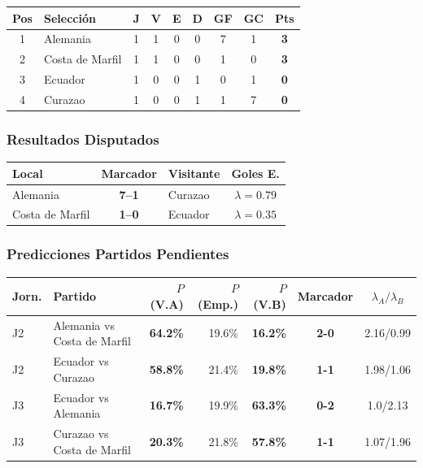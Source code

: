 \documentclass[11pt,a4paper]{article}
\newcommand{\prob}[1]{\textbf{#1\%}}
\begin{document}
\begin{center}
\begin{tabular}{@{}clccccccc@{}}
\toprule
\textbf{Pos} & \textbf{Selección} & \textbf{J} & \textbf{V} & \textbf{E} & \textbf{D} & \textbf{GF} & \textbf{GC} & \textbf{Pts} \\
\midrule
  \cellcolor{green!25}1 & \cellcolor{green!25}Alemania & 1 & 1 & 0 & 0 & 7 & 1 & \textbf{3} \\
  \cellcolor{green!25}2 & \cellcolor{green!25}Costa de Marfil & 1 & 1 & 0 & 0 & 1 & 0 & \textbf{3} \\
  \cellcolor{yellow!20}3 & \cellcolor{yellow!20}Ecuador & 1 & 0 & 0 & 1 & 0 & 1 & \textbf{0} \\
  4 & Curazao & 1 & 0 & 0 & 1 & 1 & 7 & \textbf{0} \\
\bottomrule
\end{tabular}
\end{center}

\subsubsection*{Resultados Disputados}

\begin{center}
\begin{tabular}{@{}lclc@{}}
\toprule
\textbf{Local} & \textbf{Marcador} & \textbf{Visitante} & \textbf{Goles E.} \\
\midrule
  Alemania & \textbf{7--1} & Curazao & $\lambda=0.79$ \\
  Costa de Marfil & \textbf{1--0} & Ecuador & $\lambda=0.35$ \\
\bottomrule
\end{tabular}
\end{center}

\subsubsection*{Predicciones Partidos Pendientes}


\begin{center}
\begin{tabular}{@{}llrrrcc@{}}
\toprule
\textbf{Jorn.} & \textbf{Partido} & \textbf{$P$(V.A)} & \textbf{$P$(Emp.)} & \textbf{$P$(V.B)} & \textbf{Marcador} & \textbf{$\lambda_A/\lambda_B$} \\
\midrule
  J2 & Alemania vs Costa de Marfil & \cellcolor{yellow!30}\prob{64.2} & 19.6\% & \cellcolor{red!15}\prob{16.2} & \textbf{2-0} & 2.16/0.99 \\
  J2 & Ecuador vs Curazao & \cellcolor{yellow!30}\prob{58.8} & 21.4\% & \cellcolor{red!15}\prob{19.8} & \textbf{1-1} & 1.98/1.06 \\
  J3 & Ecuador vs Alemania & \cellcolor{red!15}\prob{16.7} & 19.9\% & \cellcolor{yellow!30}\prob{63.3} & \textbf{0-2} & 1.0/2.13 \\
  J3 & Curazao vs Costa de Marfil & \cellcolor{red!15}\prob{20.3} & 21.8\% & \cellcolor{yellow!30}\prob{57.8} & \textbf{1-1} & 1.07/1.96 \\
\bottomrule
\end{tabular}
\end{center}
\end{document}
